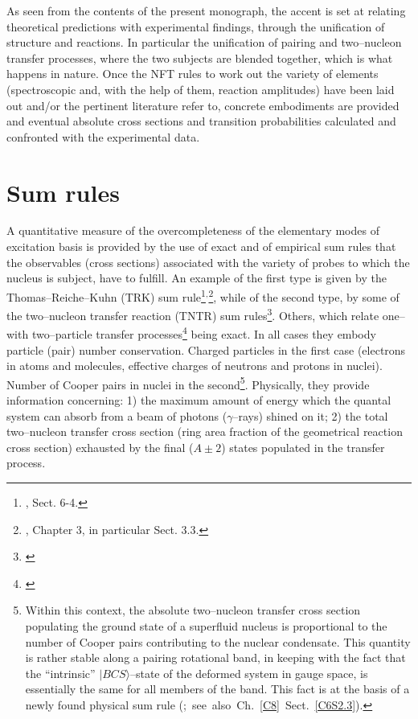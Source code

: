 As  seen from the contents of the present monograph, the accent is set at relating theoretical predictions with experimental findings, through the unification of structure and reactions. In particular the unification of pairing and two--nucleon transfer processes, where the two subjects are blended together, which is what happens in nature.  Once the NFT rules to work out the variety of elements (spectroscopic and, with the help of them, reaction amplitudes) have been laid  out and/or the pertinent literature refer to, concrete embodiments are provided and eventual absolute cross sections and transition probabilities calculated and confronted with the experimental data. 







\section{Sum rules}\label{C1S2}
A quantitative measure of the overcompleteness of  the elementary modes of excitation basis is provided by the use of exact and of empirical sum rules that the observables (cross sections) associated with the variety of probes to which the nucleus is subject, have to fulfill. An example of the first type  is given by the Thomas--Reiche--Kuhn (TRK) sum rule\footnote{\cite{Bohr:75}, Sect. 6-4.}$^,$\footnote{\cite{Bertsch:05}, Chapter 3, in particular Sect. 3.3.}, while of the second type, by some of the two--nucleon transfer reaction (TNTR) sum rules\footnote{\cite{Broglia:72b}}. Others, which relate one-- with two--particle transfer processes\footnote{\cite{Bayman:72,Lanford:77}} being exact. In all cases they embody particle (pair) number conservation. Charged particles in the first case (electrons in atoms and molecules, effective charges of neutrons and protons in nuclei). Number of Cooper pairs in nuclei in the second\footnote{Within this context, the absolute two--nucleon transfer cross section populating the ground state of a superfluid nucleus is proportional to the number of Cooper pairs contributing to the nuclear condensate. This quantity is rather stable along a pairing rotational band, in keeping with the fact that the ``intrinsic'' $|BCS\rangle$--state of the deformed system in gauge space, is essentially the same for all members of the band. This fact is at the basis of a newly found physical sum rule \mbox{(\cite{Potel:17}; see also Ch.  \ref{C8} Sect. \ref{C6S2.3})}.}. Physically, they provide  information concerning: 1) the maximum amount of energy which the quantal system can absorb from a beam of photons ($\gamma$--rays) shined on it; 2) the total two--nucleon transfer cross section (ring area fraction of the geometrical reaction cross section) exhausted by the final ($A\pm2$) states populated in the transfer process.







